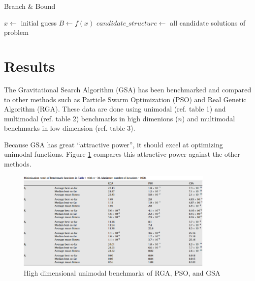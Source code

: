 \documentclass{article}
\begin{document}
            \begin{algorithm}
                \DontPrintSemicolon
                \caption{Branch \& Bound}
                \label{alg:bb}
                $x \gets $ initial guess\;
                $B \gets f(x)$\;
                $candidate\_structure \gets$ all candidate solutions of problem\;
            \end{algorithm}

\pagebreak

    \section*{Results}

        The Gravitational Search Algorithm (GSA) has been benchmarked and compared to other methods such as Particle Swarm Optimization (PSO) and Real Genetic Algorithm (RGA)\cite{GSA}.  These data are done using unimodal (ref. \cite{GSA} table 1) and multimodal (ref. \cite{GSA} table 2) benchmarks in high dimenions ($n$) and multimodal benchmarks in low dimension (ref. \cite{GSA} table 3).

        Because GSA has great ``attractive power'', it should excel at optimizing unimodal functions.  Figure \ref{fig:unimodal} compares this attractive power against the other methods.

        \begin{figure}[h]
            \centering
            \includegraphics*[width=0.86\textwidth]{images/unimodal.png}
            \caption{High dimensional unimodal benchmarks of RGA, PSO, and GSA}
            \label{fig:unimodal}
        \end{figure}
\end{document}
